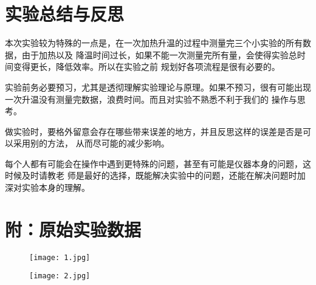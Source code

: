 \documentclass[11pt,a4paper]{article}
\begin{document}
\section{实验总结与反思}
    
    本次实验较为特殊的一点是，在一次加热升温的过程中测量完三个小实验的所有数据，由于加热以及
    降温时间过长，如果不能一次测量完所有量，会使得实验总时间变得更长，降低效率。所以在实验之前
    规划好各项流程是很有必要的。

    实验前务必要预习，尤其是透彻理解实验理论与原理。如果不预习，很有可能出现一次升温没有测量完数据，浪费时间。而且对实验不熟悉不利于我们的
    操作与思考。

    做实验时，要格外留意会存在哪些带来误差的地方，并且反思这样的误差是否是可以采用别的方法，
    从而尽可能的减少影响。

    每个人都有可能会在操作中遇到更特殊的问题，甚至有可能是仪器本身的问题，这时候及时请教老
    师是最好的选择，既能解决实验中的问题，还能在解决问题时加深对实验本身的理解。

\section*{附：原始实验数据}
    \begin{figure}[H]
        \centering
        \texttt{[image: 1.jpg]}
    \end{figure}
    \begin{figure}[H]
        \centering
        \texttt{[image: 2.jpg]}
    \end{figure}
\end{document}
